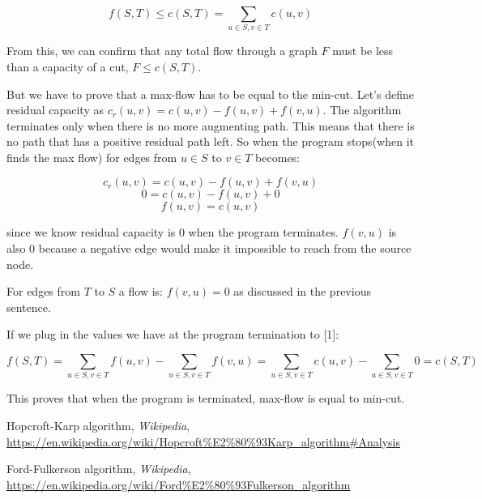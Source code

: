 \documentclass{article}
\begin{document}
\begin{enumerate}
\begin{enumerate}
        \[f(S,T)\leq c(S,T)=\sum_{u\in S,v\in T}c(u,v)\]

        From this, we can confirm that any total flow through a graph $F$ must be less than a capacity of a cut, $F\leq c(S,T)$.

        But we have to prove that a max-flow has to be equal to the min-cut.
        Let's define residual capacity as $c_r(u,v)=c(u,v)-f(u,v)+f(v,u)$.
        The algorithm terminates only when there is no more augmenting path.
        This means that there is no path that has a positive residual path left.
        So when the program stops(when it finds the max flow) for edges from $u\in S$ to $v\in T$ becomes:

        \[c_r(u,v)=c(u,v)-f(u,v)+f(v,u)\]
        \[0=c(u,v)-f(u,v)+0\]
        \[f(u,v)=c(u,v)\]

        since we know residual capacity is $0$ when the program terminates.
        $f(v,u)$ is also $0$ because a negative edge would make it impossible to reach from the source node.

        For edges from $T$ to $S$ a flow is: $f(v,u)=0$ as discussed in the previous sentence.

        If we plug in the values we have at the program termination to [1]:

        \[f(S,T)=\sum_{u\in S,v\in T}f(u,v)-\sum_{u\in S,v\in T}f(v,u)=\sum_{u\in S,v\in T}c(u,v)-\sum_{u\in S,v\in T}0=c(S,T)\]

        This proves that when the program is terminated, max-flow is equal to min-cut.

    \end{enumerate}
    
\end{enumerate}

\begin{thebibliography}{9}
    
    Hopcroft-Karp algorithm, \emph{Wikipedia}, \url{https://en.wikipedia.org/wiki/Hopcroft%E2%80%93Karp_algorithm#Analysis}
    
    Ford-Fulkerson algorithm, \emph{Wikipedia}, \url{https://en.wikipedia.org/wiki/Ford%E2%80%93Fulkerson_algorithm}

    
    
    \end{thebibliography}
\end{document}
